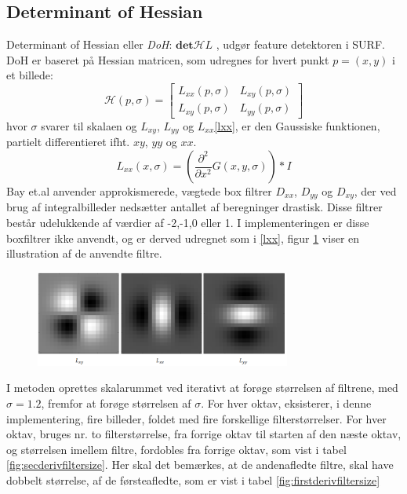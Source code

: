 \subsection{Determinant of Hessian}
Determinant of Hessian eller \textit{DoH}: $\textbf{det}\mathcal{H}L$ , udgør feature detektoren i
SURF. DoH er baseret på Hessian matricen, som udregnes for hvert punkt $p=(x,y)$ i et billede:
\begin{equation}
\mathcal{H}(p, \sigma) = 
 \begin{bmatrix}
 	L_{xx}(p, \sigma) & L_{xy}(p, \sigma) \\
 	L_{xy}(p, \sigma) & L_{yy}(p, \sigma) 
 \end{bmatrix}
 \label{hessianmatrix}
\end{equation}
hvor $\sigma$ svarer til skalaen og $L_{xy} $, $L_{yy}$ og $L_{xx}$\eqref{lxx}, er den Gaussiske funktionen, partielt differentieret ifht. $xy$, $yy$ og $xx$.
\begin{equation}
L_{xx}(x, \sigma) = (\frac{\partial^2 }{\partial x^2 } G(x,y,\sigma)) * I
\label{lxx}
\end{equation}
Bay et.al anvender approkismerede, vægtede box filtrer $D_{xx}$, $D_{yy}$ og $D_{xy}$, der ved brug af integralbilleder nedsætter antallet af beregninger drastisk. Disse filtrer består udelukkende af værdier af -2,-1,0 eller 1. I implementeringen er disse boxfiltrer ikke anvendt, og er derved udregnet som i \eqref{lxx}, figur \ref{fig:lxxlyylxy} viser en illustration af de anvendte filtre.
\begin{figure}[H]
    \centering
    \includegraphics[width=0.75\textwidth]{fig/31.png}
     \vspace{-0.5em}
    \begin{center}    
       \caption{\textcolor{gray}{\footnotesize \textit{ }}}
    \label{fig:lxxlyylxy}
     \end{center}
     \vspace{-2.5em}
  \end{figure} \noindent
I metoden oprettes skalarummet ved iterativt at forøge størrelsen af filtrene, med $\sigma=1.2$, fremfor at forøge størrelsen af $\sigma$. For hver oktav, eksisterer, i denne implementering, fire billeder, foldet med fire forskellige filterstørrelser. For hver oktav, bruges nr. to filterstørrelse, fra forrige oktav til starten af den næste oktav, og størrelsen imellem filtre, fordobles fra forrige oktav, som vist i tabel \ref{fig:secderivfiltersize}. Her skal det bemærkes, at de andenafledte filtre, skal have dobbelt størrelse, af de førsteafledte, som er vist i tabel \ref{fig:firstderivfiltersize}
